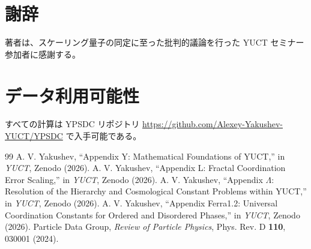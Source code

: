 \documentclass[12pt,a4paper]{article}
\begin{document}
	\section*{謝辞}
	著者は、スケーリング量子の同定に至った批判的議論を行った YUCT セミナー参加者に感謝する。
	
	\section*{データ利用可能性}
	すべての計算は YPSDC リポジトリ \url{https://github.com/Alexey-Yakushev-YUCT/YPSDC} で入手可能である。
	
	\begin{thebibliography}{99}
		 A. V. Yakushev, ``Appendix Y: Mathematical Foundations of YUCT,'' in \emph{YUCT}, Zenodo (2026).
		 A. V. Yakushev, ``Appendix L: Fractal Coordination Error Scaling,'' in \emph{YUCT}, Zenodo (2026).
		 A. V. Yakushev, ``Appendix \(\Lambda\): Resolution of the Hierarchy and Cosmological Constant Problems within YUCT,'' in \emph{YUCT}, Zenodo (2026).
		 A. V. Yakushev, ``Appendix Ferra1.2: Universal Coordination Constants for Ordered and Disordered Phases,'' in \emph{YUCT}, Zenodo (2026).
		 Particle Data Group, \emph{Review of Particle Physics}, Phys. Rev. D \textbf{110}, 030001 (2024).
	\end{thebibliography}
	
\end{document}
